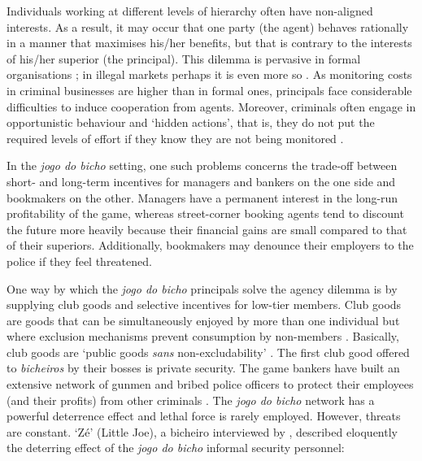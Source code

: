 Individuals working at different levels of hierarchy often have non-aligned interests. As a result, it may occur that one party (the agent) behaves rationally in a manner that maximises his/her benefits, but that is contrary to the interests of his/her superior (the principal). This dilemma is pervasive in formal organisations \citep{holmstrom1979moral,jensen1976theory,moe1984new,shapiro2005agency,spence1971insurance}; in illegal markets perhaps it is even more so \citep{campana2013cooperation,gambetta2009codes,skarbek2011governance,skarbek2014social}. As monitoring costs in criminal businesses are higher than in formal ones, principals face considerable difficulties to induce cooperation from agents. Moreover, criminals often engage in opportunistic behaviour and `hidden actions', that is, they do not put the required levels of effort if they know they are not being monitored \citep[38--42]{arrow1985agency}.

In the \emph{jogo do bicho} setting, one such problems concerns the trade-off between short- and long-term incentives for managers and bankers on the one side and bookmakers on the other. Managers have a permanent interest in the long-run profitability of the game, whereas street-corner booking agents tend to discount the future more heavily because their financial gains are small compared to that of their superiors. Additionally, bookmakers may denounce their employers to the police if they feel threatened.

One way by which the \emph{jogo do bicho} principals solve the agency dilemma is by supplying club goods and selective incentives for low-tier members. Club goods are goods that can be simultaneously enjoyed by more than one individual but where exclusion mechanisms prevent consumption by non-members \citep{buchanan1965economic, cornes1996theory, olson1965logic, sandler1980economic, sandler1997club}. Basically, club goods are `public goods \emph{sans} non-excludability' \citep[928]{mcnutt1999public}. The first club good offered to \emph{bicheiros} by their bosses is private security. The game bankers have built an extensive network of gunmen and bribed police officers to protect their employees (and their profits) from other criminals \citetext{\citealp[48]{chinelli1993vazio}; \citealp[51]{labronici2012paratodos}}. The \emph{jogo do bicho} network has a powerful deterrence effect and lethal force is rarely employed. However, threats are constant. `Zé' (Little Joe), a bicheiro interviewed by \citet[52]{labronici2012paratodos}, described eloquently the deterring effect of the \emph{jogo do bicho} informal security personnel:

